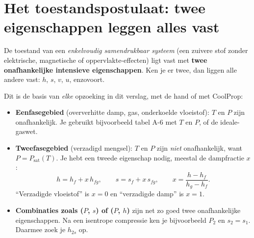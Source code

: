 \section{Het toestandspostulaat: twee eigenschappen leggen alles vast}
\begin{methode}
De toestand van een \emph{enkelvoudig samendrukbaar systeem} (een zuivere stof zonder elektrische, magnetische
of oppervlakte-effecten) ligt vast met \textbf{twee onafhankelijke intensieve eigenschappen}. Ken je er twee,
dan liggen alle andere vast: $h$, $s$, $v$, $u$, enzovoort.
\end{methode}
Dit is de basis van \emph{elke} opzoeking in dit verslag, met de hand of met CoolProp:
\begin{itemize}
  \item \textbf{Eenfasegebied} (oververhitte damp, gas, onderkoelde vloeistof): $T$ en $P$ zijn onafhankelijk.
        Je gebruikt bijvoorbeeld tabel A-6 met $T$ en $P$, of de ideale-gaswet.
  \item \textbf{Tweefasegebied} (verzadigd mengsel): $T$ en $P$ zijn \emph{niet} onafhankelijk, want
        $P = P_\mathrm{sat}(T)$. Je hebt een tweede eigenschap nodig, meestal de dampfractie $x$:
        \[
        h = h_f + x\,h_{fg},\qquad s = s_f + x\,s_{fg},\qquad x = \frac{h-h_f}{h_g-h_f}.
        \]
        ``Verzadigde vloeistof'' is $x=0$ en ``verzadigde damp'' is $x=1$.
  \item \textbf{Combinaties zoals ($P$, $s$) of ($P$, $h$)} zijn net zo goed twee onafhankelijke eigenschappen. Na een
        isentrope compressie ken je bijvoorbeeld $P_2$ en $s_2=s_1$. Daarmee zoek je $h_{2s}$ op.
\end{itemize}

